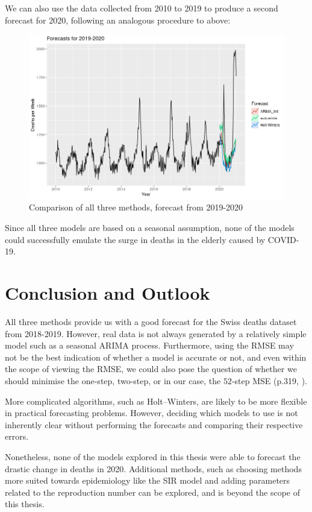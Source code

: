 \documentclass[a4paper, oneside]{discothesis}
\begin{document}
We can also use the data collected from 2010 to 2019 to produce a second forecast for 2020, following an analogous procedure to above:
\begin{figure}[H]
\centering
\includegraphics[width=.9\textwidth]{figures/all_2020.png}
\caption{Comparison of all three methods, forecast from 2019-2020}
\end{figure}
Since all three models are based on a seasonal assumption, none of the models could successfully emulate the surge in deaths in the elderly caused by COVID-19.

\section{Conclusion and Outlook}
All three methods provide us with a good forecast for the Swiss deaths dataset from 2018-2019. However, real data is not always generated by a relatively simple model such as a seasonal ARIMA process. Furthermore, using the RMSE may not be the best indication of whether a model is accurate or not, and even within the scope of viewing the RMSE, we could also pose the question of whether we should minimise the one-step, two-step, or in our case, the $52$-step MSE (p.319, \cite{itsf}).

More complicated algorithms, such as Holt--Winters, are likely to be more flexible in practical forecasting problems. However, deciding which models to use is not inherently clear without performing the forecasts and comparing their respective errors.

Nonetheless, none of the models explored in this thesis were able to forecast the drastic change in deaths in 2020. Additional methods, such as choosing methods more suited towards epidemiology like the SIR model and adding parameters related to the reproduction number can be explored, and is beyond the scope of this thesis.
\end{document}

